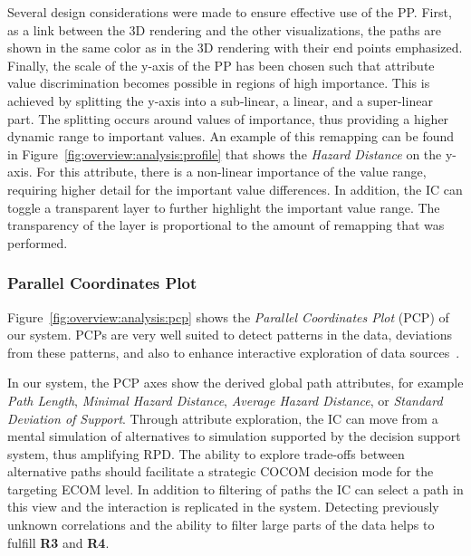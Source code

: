 \documentclass{egpubl}
\begin{document}
Several design considerations were made to ensure effective use of the PP. First, as a link between the 3D rendering and the other visualizations, the paths are shown in the same color as in the 3D rendering with their end points emphasized. Finally, the scale of the y-axis of the PP has been chosen such that attribute value discrimination becomes possible in regions of high importance. This is achieved by splitting the y-axis into a sub-linear, a linear, and a super-linear part. The splitting occurs around values of importance, thus providing a higher dynamic range to important values. An example of this remapping can be found in Figure~\ref{fig:overview:analysis:profile} that shows the \emph{Hazard Distance} on the y-axis. For this attribute, there is a non-linear importance of the value range, requiring higher detail for the important value differences. In addition, the IC can toggle a transparent layer to further highlight the important value range. The transparency of the layer is proportional to the amount of remapping that was performed.

\subsubsection{Parallel Coordinates Plot} \label{sec:overview:analysis:pcp}
Figure~\ref{fig:overview:analysis:pcp} shows the \emph{Parallel Coordinates Plot} (PCP) of our system. PCPs are very well suited to detect  patterns in the data, deviations from these patterns, and also to enhance interactive exploration of data sources~\cite{Tory05aparallel}.

In our system, the PCP axes show the derived global path attributes, for example \emph{Path Length}, \emph{Minimal Hazard Distance}, \emph{Average Hazard Distance}, or \emph{Standard Deviation of Support}. Through attribute exploration, the IC can move from a mental simulation of alternatives to simulation supported by the decision support system, thus amplifying RPD. The ability to explore trade-offs between alternative paths should facilitate a strategic COCOM decision mode for the targeting ECOM level. In addition to filtering of paths the IC can select a path in this view and the interaction is replicated in the system. Detecting previously unknown correlations and the ability to filter large parts of the data helps to fulfill {\bfseries R3} and {\bfseries R4}.
\end{document}
